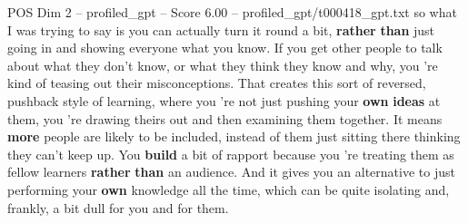 \begin{textsample}{POS Dim 2 – profiled\_gpt – Score 6.00 – profiled\_gpt/t000418\_gpt.txt}  \label{ex:f2_pos_018}
so what I was trying to say is you can actually turn it round a bit, \textbf{rather} \textbf{than} just going in and showing everyone what you know.
If you get other people to talk about what they don't know, or what they think they know and why, you ’re kind of teasing out their misconceptions.
That creates this sort of reversed, pushback style of learning, where you ’re not just pushing your \textbf{own} \textbf{ideas} at them, you ’re drawing theirs out and then examining them together.
It means \textbf{more} people are likely to be included, instead of them just sitting there thinking they can't keep up.
You \textbf{build} a bit of rapport because you ’re treating them as fellow learners \textbf{rather} \textbf{than} an audience.
And it gives you an alternative to just performing your \textbf{own} knowledge all the time, which can be quite isolating and, frankly, a bit dull for you and for them.

\end{textsample}
